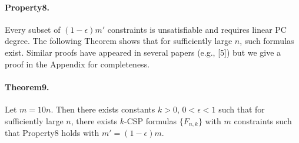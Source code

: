 \paragraph{Property8.} Every subset of $(1-\epsilon)m'$ constraints is unsatisfiable and requires linear PC degree.
The following Theorem shows that for sufficiently large $n$, such formulas exist. Similar proofs have appeared in several papers (e.g., [5]) but we give a proof in the Appendix for completeness.
\paragraph{Theorem9.} Let $m=10n$. Then there exists constants $k>0$, $0<\epsilon<1$ such that for sufficiently large $n$, there exists $k$-CSP formulas $\{F_{n,k}\}$ with $m$ constraints such that Property8 holds with $m'=(1-\epsilon)m$.
